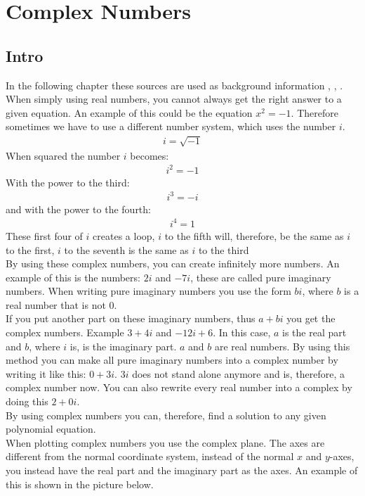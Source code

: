 \chapter{Complex Numbers}
\section{Intro}
In the following chapter these sources are used as background information \cite{complexpaul}, \cite{complexpurple}, \cite{complexnotebook}.
When simply using real numbers, you cannot always get the right answer to a given equation. An example of this could be the equation $x^2=-1$. Therefore sometimes we have to use a different number system, which uses the number $i$. 
\begin{align*}
i=\sqrt{-1}
\end{align*}
When squared the number $i$ becomes:
\begin{align*}
i^2=-1
\end{align*}
With the power to the third:
\begin{align*}
i^3=-i
\end{align*}
and with the power to the fourth:
\begin{align*}
i^4=1
\end{align*}
These first four of $i$ creates a loop, $i$ to the fifth will, therefore, be the same as $i$ to the first, $i$ to the seventh is the same as $i$ to the third \\
By using these complex numbers, you can create infinitely more numbers.  
An example of this is the numbers: $2i$ and $-7i$, these are called pure imaginary numbers. When writing pure imaginary numbers you use the form $bi$, where $b$ is a real number that is not $0$. \\
If you put another part on these imaginary numbers, thus $a+bi$ you get the complex numbers. Example $3+4i$ and $-12i+6$. In this case, $a$ is the real part and $b$, where $i$ is, is the imaginary part. $a$ and $b$ are real numbers. By using this method you can make all pure imaginary numbers into a complex number by writing it like this: $0+3i$. $3i$ does not stand alone anymore and is, therefore, a complex number now. You can also rewrite every real number into a complex by doing this $2+0i$. \\
By using complex numbers you can, therefore, find a solution to any given polynomial equation. \\ 
When plotting complex numbers you use the complex plane. The axes are different from the normal coordinate system, instead of the normal $x$ and $y$-axes, you instead have the real part and the imaginary part as the axes. An example of this is shown in the picture below.



